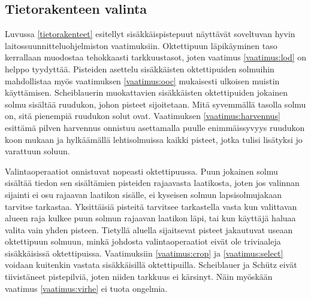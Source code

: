 \subsection{Tietorakenteen valinta}

Luvussa \ref{tietorakenteet} esitellyt sisäkkäispistepuut näyttävät soveltuvan hyvin laitossuunnitteluohjelmiston vaatimuksiin. Oktettipuun läpikäyminen taso kerrallaan muodostaa tehokkaasti tarkkuustasot, joten vaatimus \ref{vaatimus:lod} on helppo tyydyttää. Pisteiden asettelu sisäkkäisten oktettipuiden solmuihin mahdollistaa myös vaatimuksen \ref{vaatimus:ooc} mukaisesti ulkoisen muistin käyttämisen. Scheiblauerin muokattavien sisäkkäisten oktettipuiden jokainen solmu sisältää ruudukon, johon pisteet sijoitetaan. Mitä syvemmällä tasolla solmu on, sitä pienempiä ruudukon solut ovat. Vaatimuksen \ref{vaatimus:harvennus} esittämä pilven harvennus onnistuu asettamalla puulle enimmäissyvyys ruudukon koon mukaan ja hylkäämällä lehtisolmuissa kaikki pisteet, jotka tulisi lisätyksi jo varattuun soluun. 

Valintaoperaatiot onnistuvat nopeasti oktettipuussa. Puun jokainen solmu sisältää tiedon sen sisältämien pisteiden rajaavasta laatikosta, joten jos valinnan sijainti ei osu rajaavan laatikon sisälle, ei kyseisen solmun lapsisolmujakaan tarvitse tarkastaa. Yksittäisiä pisteitä tarvitsee tarkastella vasta kun valittavan alueen raja kulkee puun solmun rajaavan laatikon läpi, tai kun käyttäjä haluaa valita vain yhden pisteen. Tietyllä aluella sijaitsevat pisteet jakautuvat useaan oktettipuun solmuun, minkä johdosta valintaoperaatiot eivät ole triviaaleja sisäkkäisissä oktettipuissa. Vaatimuksiin \ref{vaatimus:crop} ja \ref{vaatimus:select} voidaan kuitenkin vastata sisäkkäisillä oktettipuilla. Scheiblauer ja Schütz eivät tiivistäneet pistepilviä, joten niiden tarkkuus ei kärsinyt. Näin myöskään vaatimus \ref{vaatimus:virhe} ei tuota ongelmia.


